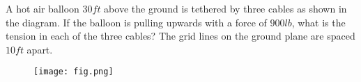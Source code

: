 
A hot air balloon $30 ft$ above the ground is tethered by three cables as shown in the diagram. If the balloon is pulling upwards with a force of $900 lb$, what is the tension in each of the three cables? The grid lines on the ground plane are spaced $10 ft$ apart.

\begin{figure}[ht!]
  \centering
  \texttt{[image: fig.png]}
\end{figure}

\iftoggle{flagSoln}{%
\vspace{.5cm}
\rule{\textwidth}{.4pt}
\vspace{.5cm}
\textbf{Solution:}
\begin{figure}[ht!]
  \centering
  \texttt{[image: soln.png]}
\end{figure}
}{%
}%
